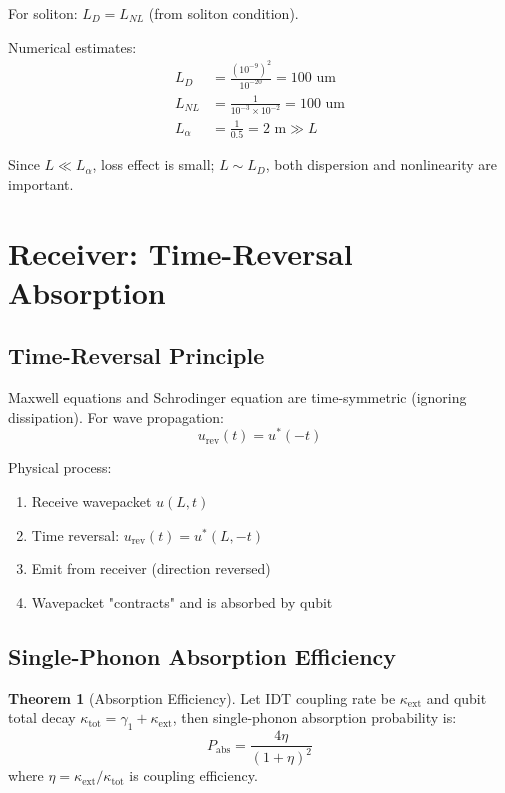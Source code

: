 \documentclass[12pt,a4paper]{article}
\theoremstyle{definition}
\newtheorem{theorem}{Theorem}[section]
\begin{document}
For soliton: $L_D = L_{NL}$ (from soliton condition).

Numerical estimates:
\begin{align}
L_D &= \frac{(10^{-9})^2}{10^{-20}} = 100\text{ um} \\
L_{NL} &= \frac{1}{10^{-3}\times10^{-2}} = 100\text{ um} \\
L_{\alpha} &= \frac{1}{0.5} = 2\text{ m} \gg L
\end{align}

Since $L \ll L_{\alpha}$, loss effect is small; $L \sim L_D$, both dispersion and nonlinearity are important.

\section{Receiver: Time-Reversal Absorption}

\subsection{Time-Reversal Principle}

Maxwell equations and Schrodinger equation are time-symmetric (ignoring dissipation). For wave propagation:
\begin{equation}
u_{\text{rev}}(t) = u^*(-t)
\end{equation}

Physical process:
\begin{enumerate}
\item Receive wavepacket $u(L,t)$
\item Time reversal: $u_{\text{rev}}(t) = u^*(L,-t)$
\item Emit from receiver (direction reversed)
\item Wavepacket "contracts" and is absorbed by qubit
\end{enumerate}

\subsection{Single-Phonon Absorption Efficiency}

\begin{theorem}[Absorption Efficiency]
Let IDT coupling rate be $\kappa_{\text{ext}}$ and qubit total decay $\kappa_{\text{tot}} = \gamma_1 + \kappa_{\text{ext}}$, then single-phonon absorption probability is:
\begin{equation}
\boxed{P_{\text{abs}} = \frac{4\eta}{(1+\eta)^2}}
\end{equation}
where $\eta = \kappa_{\text{ext}}/\kappa_{\text{tot}}$ is coupling efficiency.
\end{theorem}
\end{document}
